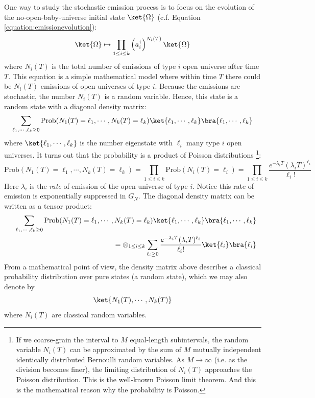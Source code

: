 \documentclass[a4paper,11pt]{article}
\theoremstyle{definition}
\numberwithin{equation}{section}
\newcommand{\lb}{\left(}
\newcommand{\rb}{\right)}
\newcommand{\nn}{\nonumber}
\begin{document}
One way to study the stochastic emission process is to focus on the evolution of the no-open-baby-universe initial state $\ket{\Omega}$ (c.f. Equation \ref{equation:emissionevolution}):
\begin{equation}
    \ket{\Omega}\mapsto \prod_{1\leq i\leq k}\lb a^\dagger_i\rb^{N_i(T)}\ket{\Omega}
\end{equation}
where $N_i(T)$ is the total number of emissions of type $i$ open universe after time $T$. This equation is a simple mathematical model where within time $T$ there could be $N_i(T)$ emissions of open universes of type $i$. Because the emissions are stochastic, the number $N_i(T)$ is a random variable. Hence, this state is a random state with a diagonal density matrix:
\begin{equation}
    \sum_{\ell_1,\cdots,\ell_k\geq 0}\text{Prob}(N_1(T) = \ell_1,\cdots,N_k(T) = \ell_k)\ket{\ell_1,\cdots,\ell_k}\bra{\ell_1,\cdots,\ell_k}
\end{equation}
where $\ket{\ell_1,\cdots,\ell_k}$ is the number eigenstate with $\ell_i$ many type $i$ open universes. It turns out that the probability is a product of Poisson distributions  \footnote{If we coarse-grain the interval to $M$ equal-length subintervals, the random variable $N_i(T)$ can be approximated by the sum of $M$ mutually independent identically distributed Bernoulli random variables. As $M\rightarrow \infty$ (i.e. as the division becomes finer), the limiting distribution of $N_i(T)$ approaches the Poisson distribution. This is the well-known Poisson limit theorem. And this is the mathematical reason why the probability is Poisson.}:
\begin{equation}
    \text{Prob}(N_1(T) = \ell_1,\cdots,N_k(T) = \ell_k) = \prod_{1\leq i\leq k}\text{Prob}(N_i(T) = \ell_i) = \prod_{1\leq i\leq k}\frac{e^{-\lambda_i T}(\lambda_i T)^{\ell_i}}{\ell_i!}
\end{equation}
Here $\lambda_i$ is the \textit{rate} of emission of the open universe of type $i$. Notice this rate of emission is exponentially suppressed in $G_N$. The diagonal density matrix can be written as a tensor product:
\begin{eqnarray}
        &&\sum_{\ell_1,\cdots,\ell_k\geq 0}\text{Prob}(N_1(T) = \ell_1,\cdots,N_k(T) = \ell_k)\ket{\ell_1,\cdots,\ell_k}\bra{\ell_1,\cdots,\ell_k}\nn\\
        &&= \otimes_{1\leq i\leq k}\sum_{\ell_i\geq 0}\frac{e^{-\lambda_i T}(\lambda_i T)^{\ell_i}}{\ell_i!}\ket{\ell_i}\bra{\ell_i}
\end{eqnarray}
From a mathematical point of view, the density matrix above describes a classical probability distribution over pure states (a random state), which we may also denote by
\begin{equation}
    \ket{N_1(T),\cdots,N_k(T)}
\end{equation} 
where $N_i(T)$ are classical random variables.
\end{document}
